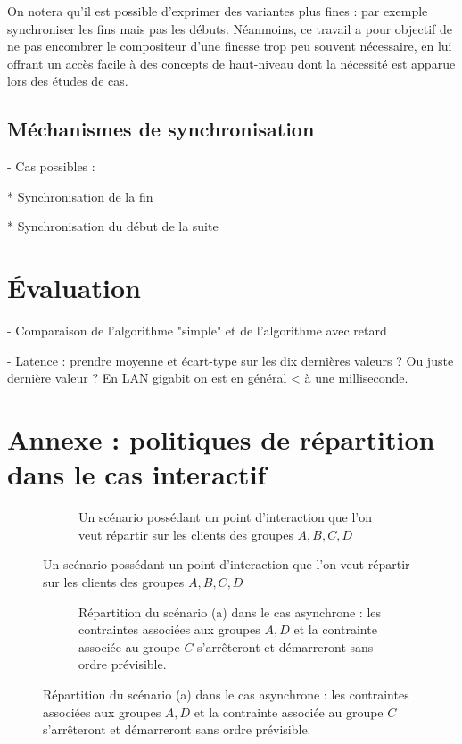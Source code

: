\documentclass{article}
\newcommand\trigger{point d'interaction\xspace}
\begin{document}
On notera qu'il est possible d'exprimer des variantes plus fines : par exemple synchroniser les fins mais pas les débuts. 
Néanmoins, ce travail a pour objectif de ne pas encombrer le compositeur d'une finesse trop peu souvent nécessaire, en lui offrant un accès facile à des concepts de haut-niveau dont la nécessité est apparue lors des études de cas.
\subsection{Méchanismes de synchronisation}
- Cas possibles : 


* Synchronisation de la fin

* Synchronisation du début de la suite

\section{Évaluation}\label{sec.evaluation}

- Comparaison de l'algorithme "simple" et de l'algorithme avec retard


- Latence : prendre moyenne et écart-type sur les dix dernières valeurs ? Ou juste dernière valeur ?
En LAN gigabit on est en général < à une milliseconde.


\printbibliography 

\newpage

\section*{Annexe : politiques de répartition dans le cas interactif}

\begin{figure}[h]
	\centering
	\begin{subfigure}{.5\linewidth}
		\begin{tikzpicture}
		
		\end{tikzpicture}
		\caption{Un scénario possédant un \trigger que l'on veut répartir sur les clients des groupes $A,B,C,D$}
	\end{subfigure}
\end{figure}

\begin{figure}[h]
	\centering
	\ContinuedFloat
	\begin{subfigure}{.5\linewidth}
		\caption{Répartition du scénario (a) dans le cas asynchrone : les contraintes associées aux groupes $A,D$ et la contrainte associée au groupe $C$ s'arrêteront et démarreront sans ordre prévisible.}
	\end{subfigure}
\end{figure}
\end{document}
